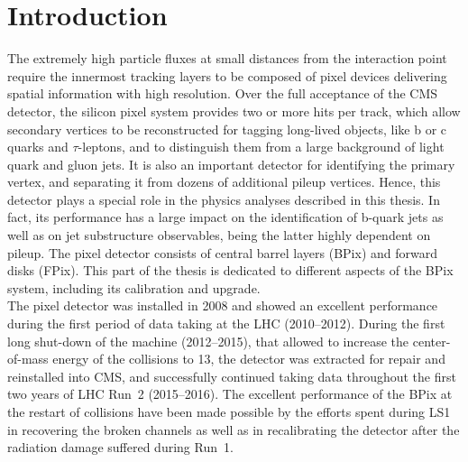 \chapter{Introduction}\label{ch:BPixIntro}

The extremely high particle fluxes at small distances from the interaction point require the innermost tracking layers to be composed of pixel devices delivering spatial information with high resolution.
Over the full acceptance of the CMS detector, the silicon pixel system provides two or more hits per track, which allow secondary vertices to be reconstructed for tagging long-lived objects, like b or c quarks and $\tau$-leptons, and to distinguish them from a large background of light quark and gluon jets. It is also an important detector for identifying the primary vertex, and separating it from dozens of additional pileup vertices.
Hence, this detector plays a special role in the physics analyses described in this thesis. In fact, its performance has a large impact on the identification of b-quark jets as well as on jet substructure observables, being the latter highly dependent on pileup.
The pixel detector consists of central barrel layers (BPix) and forward disks (FPix).
This part of the thesis is dedicated to different aspects of the BPix system, including its calibration and upgrade.\\ 

The pixel detector was installed in 2008 and showed an excellent performance during the first period of data taking at the LHC (2010--2012).
During the first long shut-down of the machine (2012--2015), that allowed to increase the center-of-mass energy of the collisions to 13\TeV, the detector was extracted for repair and reinstalled into CMS, and successfully continued taking data throughout the first two years of LHC Run~2 (2015--2016). The excellent performance of the BPix at the restart of collisions have been made possible by the efforts spent during LS1 in recovering the broken channels as well as in recalibrating the detector after the radiation damage suffered during Run~1.

